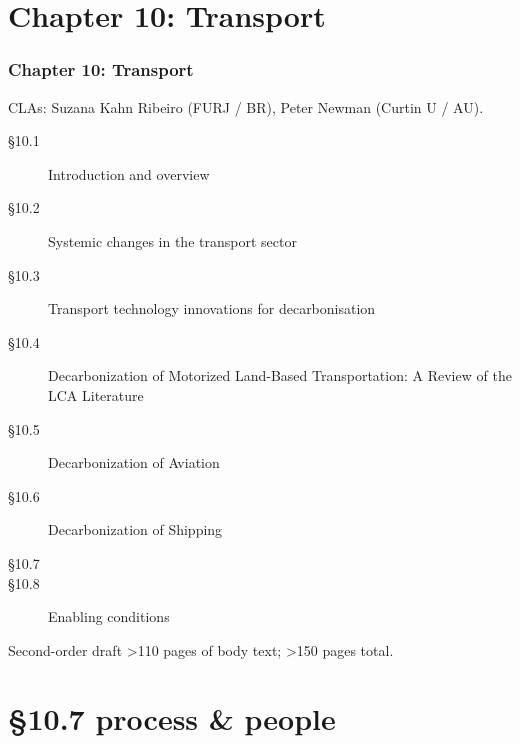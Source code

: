\documentclass[12pt,aspectratio=169]{beamer}
\begin{document}
\section{Chapter 10: Transport}

\begin{frame}
\frametitle{Chapter 10: Transport}

CLAs: Suzana Kahn Ribeiro (FURJ / BR), Peter Newman (Curtin U / AU).

\smallskip
\begin{description}
  \item [§10.1] Introduction and overview
  \item [§10.2] Systemic changes in the transport sector
  \item [§10.3] Transport technology innovations for decarbonisation
  \item [§10.4] Decarbonization of Motorized Land-Based Transportation: A Review of the LCA Literature
  \item [§10.5] Decarbonization of Aviation
  \item [§10.6] Decarbonization of Shipping
  \item [§10.7] 
  \item [§10.8] Enabling conditions
\end{description}

\smallskip
Second-order draft >110 pages of body text; >150 pages total.

\end{frame}

\section{§10.7 process \& people}
\end{document}
